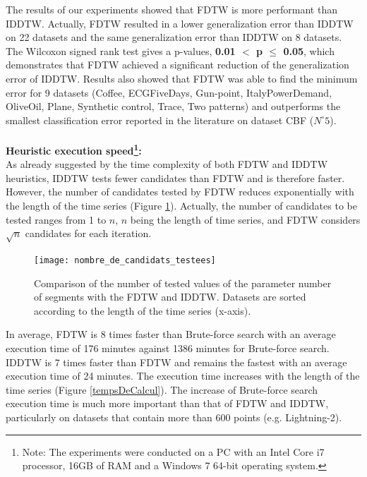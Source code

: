 The results of our experiments showed that FDTW is more performant than IDDTW. Actually, FDTW resulted in a
lower generalization error than IDDTW on 22 datasets and the same generalization error than IDDTW on 8
datasets.  The Wilcoxon signed rank test gives a
p-values, \textbf{ 0.01 $<$ p $\leq$ 0.05}, which demonstrates that FDTW achieved a
significant reduction of the generalization error of IDDTW. Results also showed that FDTW was able to
find the minimum error for 9 datasets (Coffee, ECGFiveDays, Gun-point, ItalyPowerDemand, OliveOil, Plane, Synthetic control, Trace, Two
patterns) and outperforms the smallest classification error reported in the literature on
dataset CBF ($N^{\circ} 5$).




\paragraph{}\textbf{Heuristic execution speed\footnote{Note: The experiments were conducted on a PC with an Intel Core i7 processor, 16GB of RAM and a Windows 7 64-bit operating system.}: }\\
As already suggested by the time complexity of both FDTW and IDDTW heuristics, IDDTW
tests fewer candidates than FDTW and is therefore faster. However, the number of candidates tested
by FDTW reduces exponentially with the length of the time series (Figure
\ref{NumberOfValuesTested}).
Actually, the number of candidates to be tested ranges from 1 to $n$, $n$ being the  length of time
series, and FDTW considers $\sqrt{n}$ candidates for each iteration.



\begin{figure}
\center
\texttt{[image: nombre\_de\_candidats\_testees]}
\caption{Comparison of the number of tested values of the parameter number of segments with
the FDTW and IDDTW.  Datasets are sorted according to
the length of the time series (x-axis). }

\label{NumberOfValuesTested}

\end{figure}

In average, FDTW is 8 times faster than Brute-force search with an average execution time of 176 minutes
against 1386 minutes for Brute-force search. IDDTW is 7 times faster than FDTW and remains
the fastest with an average execution time of 24 minutes. The execution time increases with the length of the time series (Figure 
\ref{tempsDeCalcul}). The increase of Brute-force search execution time is much more important than that of FDTW
and IDDTW, particularly on datasets that contain more than 600 points (e.g. Lightning-2). 

